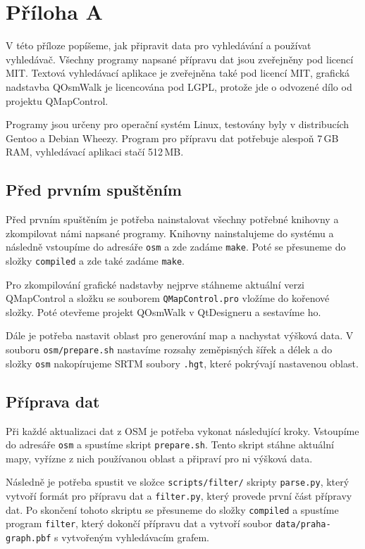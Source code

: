 \chapter*{Příloha A}

V této příloze popíšeme, jak připravit data pro vyhledávání a používat
vyhledávač. Všechny programy napsané přípravu dat jsou zveřejněny pod licencí
MIT. Textová vyhledávací aplikace je zveřejněna také pod licencí MIT, grafická
nadstavba QOsmWalk je licencována pod LGPL, protože jde o odvozené dílo od
projektu QMapControl.

Programy jsou určeny pro operační systém Linux, testovány
byly v distribucích Gentoo a Debian Wheezy. Program pro přípravu dat potřebuje 
alespoň 7\,GB RAM, vyhledávací aplikaci stačí 512\,MB.

\section*{Před prvním spuštěním}
Před prvním spuštěním je potřeba nainstalovat všechny potřebné knihovny a
zkompilovat námi napsané programy. Knihovny nainstalujeme do systému a následně
vstoupíme do adresáře \verb|osm| a zde zadáme \verb|make|. Poté se přesuneme do
složky \verb|compiled| a zde také zadáme \verb|make|. 

Pro zkompilování grafické nadstavby nejprve stáhneme aktuální verzi QMapControl
a složku se souborem \verb|QMapControl.pro| vložíme do kořenové složky. Poté 
otevřeme projekt QOsmWalk v QtDesigneru a sestavíme ho. 

Dále je potřeba nastavit oblast pro generování map a nachystat výšková data. V
souboru \verb|osm/prepare.sh| nastavíme rozsahy zeměpisných šířek a délek a do
složky \verb|osm| nakopírujeme SRTM soubory \verb|.hgt|, které pokrývají
nastavenou oblast.

\section*{Příprava dat}
Při každé aktualizaci dat z OSM je potřeba vykonat následující kroky. Vstoupíme
do adresáře \verb|osm| a spustíme skript \verb|prepare.sh|. Tento skript stáhne
 aktuální mapy, vyřízne z nich používanou oblast a připraví pro ni výšková data.

Následně je potřeba spustit ve složce \verb|scripts/filter/| skripty
\verb|parse.py|, který vytvoří formát pro přípravu dat a \verb|filter.py|, který
provede první část přípravy dat. Po skončení tohoto skriptu se přesuneme do
složky \verb|compiled| a spustíme program \verb|filter|, který dokončí přípravu
dat a vytvoří soubor \verb|data/praha-graph.pbf| s vytvořeným vyhledávacím
grafem.

